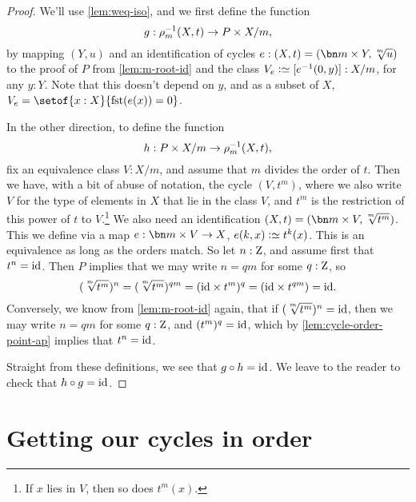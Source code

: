 \begin{proof}
  We'll use \cref{lem:weq-iso}, and we first define the function
  \[
    g : \rho_{m}^{-1}(X,t) \to P\times X/m,
  \]
  by mapping $(Y,u)$ and an identification of cycles
  $e : (X,t) = (\bn m\times Y,\sqrt[\uproot{2}m]{u})$
  to the proof of $P$ from \cref{lem:m-root-id}
  and the class $V_e\defeq [e^{-1}(0,y)]:X/m$, for any $y:Y$.
  Note that this doesn't depend on $y$, and as a subset of $X$,
  $V_e=\setof{x:X}{\fst(e(x))=0}$.

  In the other direction, to define the function
  \[
    h : P\times X/m \to \rho_{m}^{-1}(X,t),
  \]
  fix an equivalence class $V:X/m$,
  and assume that $m$ divides the order of $t$.
  Then we have, with a bit of abuse of notation, the cycle $(V,t^m)$,
  where we also write $V$ for the type of elements in $X$ that lie in the class $V$,
  and $t^m$ is the restriction of this power of $t$ to $V$.\footnote{%
    If $x$ lies in $V$, then so does $t^m(x)$.}
  We also need an identification
  $(X,t)=(\bn m\times V,\sqrt[\uproot{2}m]{t^m})$.
  This we define via a map $e : \bn m\times V \to X$, $e(k,x) \defeq t^k(x)$.
  This is an equivalence as long as the orders match.
  So let $n:\mathrm{Z}$, and assume first that $t^n=\mathord{\mathrm{id}}$.
  Then $P$ implies that we may write $n=qm$ for some $q:\mathrm{Z}$,
  so
  \[
    (\sqrt[\uproot{2}m]{t^m})^n
    = (\sqrt[\uproot{2}m]{t^m})^{qm}
    = (\id \times t^m)^q = (\id \times t^{qm}) = \id.
  \]
  Conversely, we know from \cref{lem:m-root-id} again,
  that if $(\sqrt[\uproot{2}m]{t^m})^n=\id$,
  then we may write $n=qm$ for some $q:\mathrm{Z}$,
  and $(t^m)^q=\mathord{\mathrm{id}}$, which by \cref{lem:cycle-order-point-ap}
  implies that $t^n = \mathord{\mathrm{id}}$.

  Straight from these definitions, we see that $g\circ h=\mathord{\mathrm{id}}$.
  We leave to the reader to check that $h\circ g=\mathord{\mathrm{id}}$.
\end{proof}

\section{Getting our cycles in order}
\label{sec:cycles-order}

